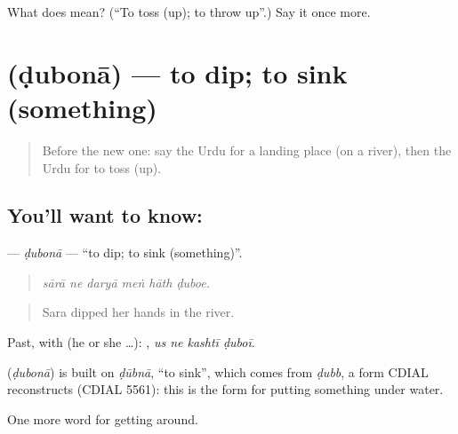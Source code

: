 \begin{tcolorbox}[breakable,colback=teal!4,colframe=teal!35!black,title={Before you move on}]
What does  mean? (\textquotedblleft{}To toss (up); to throw up\textquotedblright{}.) Say it once more.
\end{tcolorbox}
\section[\texorpdfstring{\ur{ڈبونا} (ḍubonā)}{ڈبونا (ḍubonā)}]{ (ḍubonā) — to dip; to sink (something)}

\label{lesson:UR-C434-dubona}



\begin{quote}
Before the new one: say the Urdu for a landing place (on a river), then the Urdu for to toss (up).
\end{quote}

\subsection*{You'll want to know: }
\textbf{} — \emph{ḍubonā} — \textquotedblleft{}to dip; to sink (something)\textquotedblright{}.

\begin{quote}
     
\end{quote}

\begin{quote}
\emph{sārā ne daryā meṅ hāth ḍuboe.}
\end{quote}

\begin{quote}
Sara dipped her hands in the river.
\end{quote}

Past, with  (he or she …):    , \emph{us ne kashtī ḍuboī}.

\begin{cousinweb}
\textbf{} (\emph{ḍubonā}) is built on \emph{ḍūbnā}, \textquotedblleft{}to sink\textquotedblright{}, which comes from \emph{ḍubb}, a form CDIAL reconstructs (CDIAL 5561): this is the form for putting something under water.
\end{cousinweb}

\begin{grammarlens}[title={What you've built}]
One more word for getting around.
\end{grammarlens}

